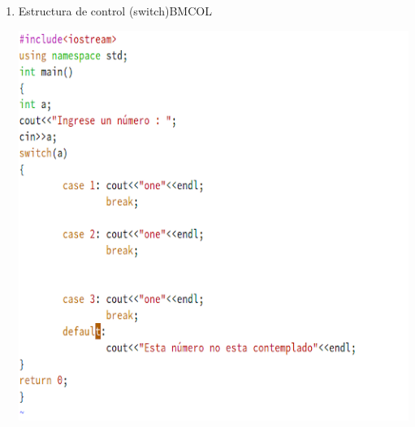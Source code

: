 \documentclass[presentation, aspectratio=54]{beamer}
\begin{document}
\begin{enumerate}
\item Estructura de control (switch)\hfill{}\textsc{BMCOL}
\label{sec:org02787f5}
\begin{center}
\includegraphics[width=.9\linewidth]{./images/codigo/code-switch.png}
\end{center}
\end{enumerate}
\end{document}
